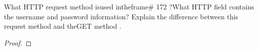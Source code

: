 \documentclass[../../main.tex]{subfiles}
\begin{document}
\begin{wts}
What HTTP request method isused intheframe# 172 ?What HTTP field contains the username and password information? Explain the difference between this request method and theGET method .
\end{wts}
\begin{proof}

\end{proof}
\end{document}
